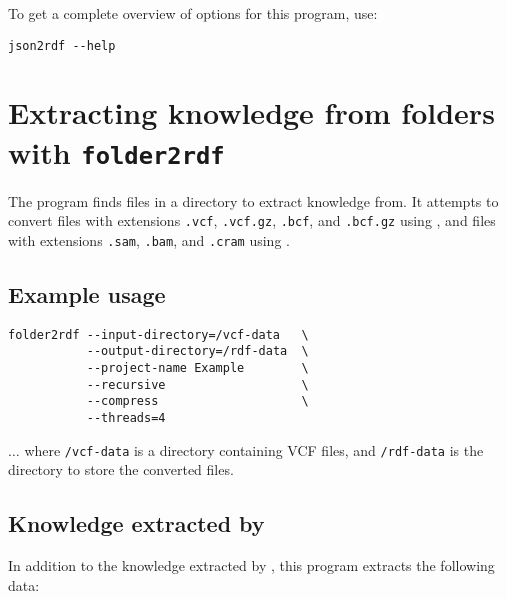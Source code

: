 To get a complete overview of options for this program, use:
\begin{siderules}
\begin{verbatim}
json2rdf --help
\end{verbatim}
\end{siderules}

\section{Extracting knowledge from folders with \texttt{folder2rdf}}
\label{sec:folder2rdf}

  The  program finds files in a directory to extract
  knowledge from.  It attempts to convert files with extensions
  \texttt{.vcf}, \texttt{.vcf.gz}, \texttt{.bcf}, and \texttt{.bcf.gz}
  using , and files with extensions \texttt{.sam},
  \texttt{.bam}, and \texttt{.cram} using .

\subsection{Example usage}

\begin{siderules}
\begin{verbatim}
folder2rdf --input-directory=/vcf-data   \
           --output-directory=/rdf-data  \
           --project-name Example        \
           --recursive                   \
           --compress                    \
           --threads=4
\end{verbatim}
\end{siderules}

  $\ldots{}$ where \texttt{/vcf-data} is a directory containing VCF files,
  and \texttt{/rdf-data} is the directory to store the converted files.

\subsection{Knowledge extracted by }

  In addition to the knowledge extracted by \program{vcf2rdf}, this program
  extracts the following data:

